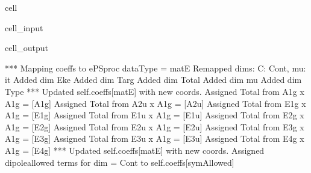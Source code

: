 \documentclass[letterpaper,table,10pt,english]{jupyterBook}
\begin{document}
\begin{sphinxuseclass}{cell}
\begin{sphinxVerbatimInput}
\begin{sphinxuseclass}{cell_input}
\begin{sphinxVerbatim}[commandchars=\\\{\}]
\PYG{p}{[}\PYG{p}{]}\PYG{p}{[}\PYG{p}{]}
\end{sphinxVerbatim}

\end{sphinxuseclass}\end{sphinxVerbatimInput}
\begin{sphinxVerbatimOutput}

\begin{sphinxuseclass}{cell_output}
\begin{sphinxVerbatim}[commandchars=\\\{\}]
*** Mapping coeffs to ePSproc dataType = matE
Remapped dims: \PYGZob{}\PYGZsq{}C\PYGZsq{}: \PYGZsq{}Cont\PYGZsq{}, \PYGZsq{}mu\PYGZsq{}: \PYGZsq{}it\PYGZsq{}\PYGZcb{}
Added dim Eke
Added dim Targ
Added dim Total
Added dim mu
Added dim Type
*** Updated self.coeffs[\PYGZsq{}matE\PYGZsq{}] with new coords.
Assigned \PYGZsq{}Total\PYGZsq{} from A1g x A1g = [\PYGZsq{}A1g\PYGZsq{}]
Assigned \PYGZsq{}Total\PYGZsq{} from A2u x A1g = [\PYGZsq{}A2u\PYGZsq{}]
Assigned \PYGZsq{}Total\PYGZsq{} from E1g x A1g = [\PYGZsq{}E1g\PYGZsq{}]
Assigned \PYGZsq{}Total\PYGZsq{} from E1u x A1g = [\PYGZsq{}E1u\PYGZsq{}]
Assigned \PYGZsq{}Total\PYGZsq{} from E2g x A1g = [\PYGZsq{}E2g\PYGZsq{}]
Assigned \PYGZsq{}Total\PYGZsq{} from E2u x A1g = [\PYGZsq{}E2u\PYGZsq{}]
Assigned \PYGZsq{}Total\PYGZsq{} from E3g x A1g = [\PYGZsq{}E3g\PYGZsq{}]
Assigned \PYGZsq{}Total\PYGZsq{} from E3u x A1g = [\PYGZsq{}E3u\PYGZsq{}]
Assigned \PYGZsq{}Total\PYGZsq{} from E4g x A1g = [\PYGZsq{}E4g\PYGZsq{}]
*** Updated self.coeffs[\PYGZsq{}matE\PYGZsq{}] with new coords.
Assigned dipole\PYGZhy{}allowed terms for dim = \PYGZsq{}Cont\PYGZsq{} to self.coeffs[\PYGZsq{}symAllowed\PYGZsq{}]
\end{sphinxVerbatim}


\end{sphinxuseclass}
\end{sphinxVerbatimOutput}
\end{sphinxuseclass}
\end{document}
